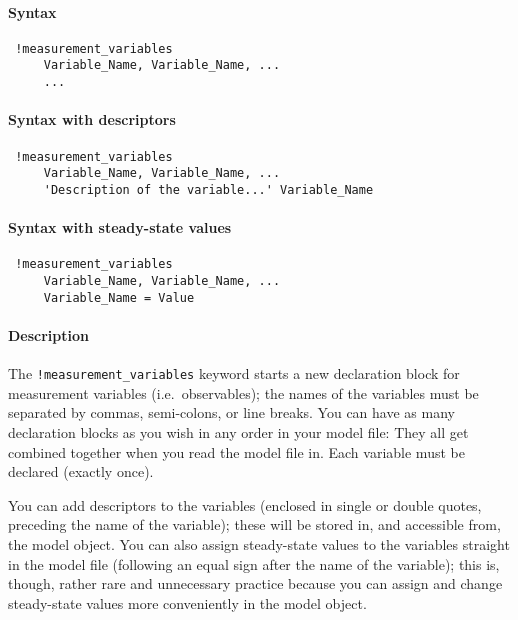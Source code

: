 


	\paragraph{Syntax}
 
 \begin{verbatim}
 !measurement_variables
     Variable_Name, Variable_Name, ...
     ...
 \end{verbatim}
 
 \paragraph{Syntax with descriptors}
 
 \begin{verbatim}
 !measurement_variables
     Variable_Name, Variable_Name, ...
     'Description of the variable...' Variable_Name
 \end{verbatim}
 
 \paragraph{Syntax with steady-state values}
 
 \begin{verbatim}
 !measurement_variables
     Variable_Name, Variable_Name, ...
     Variable_Name = Value
 \end{verbatim}
 
 \paragraph{Description}
 
 The \texttt{!measurement\_variables} keyword starts a new declaration
 block for measurement variables (i.e.~observables); the names of the
 variables must be separated by commas, semi-colons, or line breaks. You
 can have as many declaration blocks as you wish in any order in your
 model file: They all get combined together when you read the model file
 in. Each variable must be declared (exactly once).
 
 You can add descriptors to the variables (enclosed in single or double
 quotes, preceding the name of the variable); these will be stored in,
 and accessible from, the model object. You can also assign steady-state
 values to the variables straight in the model file (following an equal
 sign after the name of the variable); this is, though, rather rare and
 unnecessary practice because you can assign and change steady-state
 values more conveniently in the model object.
 
